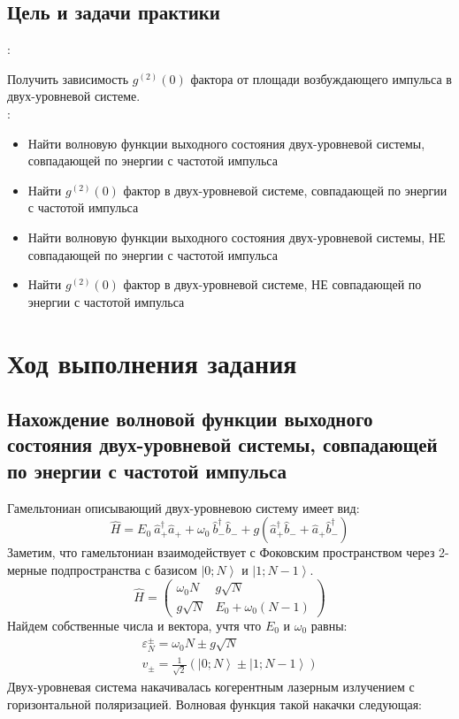 \documentclass[11pt]{article}    %
\begin{document}
\subsection{Цель и задачи практики}

{:} 

Получить зависимость $g^{(2)}(0)$ фактора от площади возбуждающего импульса в двух-уровневой системе.
\\

{:} 
\begin{itemize}
    \item Найти волновую функции выходного состояния двух-уровневой системы, совпадающей по энергии с частотой импульса
    \item Найти $g^{(2)}(0)$ фактор в двух-уровневой системе, совпадающей по энергии с частотой импульса
    \item Найти волновую функции выходного состояния двух-уровневой системы, НЕ совпадающей по энергии с частотой импульса
    \item Найти $g^{(2)}(0)$ фактор в двух-уровневой системе, НЕ совпадающей по энергии с частотой импульса
\end{itemize}


\newpage

\section{Ход выполнения задания}

\subsection{Нахождение волновой функции выходного состояния двух-уровневой системы, совпадающей по энергии с частотой импульса}
Гамельтониан описывающий двух-уровневою систему имеет вид:
\begin{equation}
    \hat{H} = E_0 \ \hat{a}^{\dag}_{+} \hat{a}_{+} + \omega_0 \ \hat{b}^{\dag}_{-} \hat{b}_{-} +  g \left( \hat{a}^{\dag}_{+} \hat{b}_{-} + \hat{a}_{+} \hat{b}^{\dag}_{-} \right)
\end{equation}
Заметим, что гамельтониан взаимодействует с Фоковским пространством через 2-мерные подпространства с базисом $ \left|  0; N \right>$ и $ \left| 1; N-1 \right>$.
\begin{equation}
    \hat{H} =
\begin{pmatrix}
    \omega_0 N & g\sqrt{N} \\
    g\sqrt{N} & E_0 + \omega_0 (N-1)
\end{pmatrix}
\end{equation}
Найдем собственные числа и вектора, учтя что $E_0$ и $\omega_0$ равны:
\begin{gather}
    \varepsilon^{\pm}_{N} = \omega_0 N \pm g\sqrt{N} \\
    v_{\pm} = \frac{1}{\sqrt{2}} \left( \left|  0; N \right> \pm \left| 1; N-1 \right> \right)
\end{gather}
Двух-уровневая система накачивалась когерентным лазерным излучением с горизонтальной поляризацией.
Волновая функция такой накачки следующая:
\end{document}
